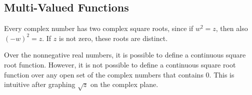 \subsection*{Multi-Valued Functions}
Every complex number has two complex square roots, since if $w^2=z$, then also $(-w)^2=z$.
If $z$ is not zero, these roots are distinct.

Over the nonnegative real numbers, it is possible to define a continuous square root function.
However, it is not possible to define a continuous square root function over any open set of the complex numbers that contains 0.
This is intuitive after graphing $\sqrt{z}$ on the complex plane.

